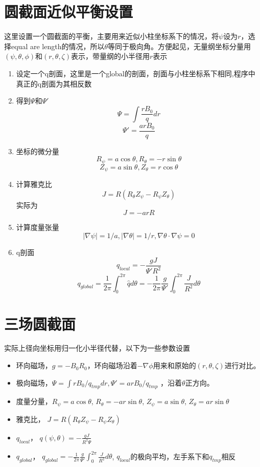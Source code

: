 \documentclass[11pt,a4paper]{article}
\begin{document}
\section{圆截面近似平衡设置}

这里设置一个圆截面的平衡，主要用来近似小柱坐标系下的情况，将$\psi$设为$r$，选择equal are length的情况，所以$\theta$等同于极向角。方便起见，无量纲坐标分量用$(\psi,\theta,\phi)$和$(r,\theta,\zeta)$表示，带量纲的小半径用$r$表示

\begin{enumerate}
 	\item 设定一个q剖面，这里是一个global的剖面，剖面与小柱坐标系下相同,程序中真正的q剖面为其相反数
 	\item 得到$\Psi$和$\Psi'$
 		$$\Psi = \int \frac{rB_0}{q} dr $$ 
 		$$\Psi' = \frac{arB_0}{q}  $$
	\item 坐标的微分量 
		$$ R_\psi = a\cos\theta, R_\theta = -r\sin\theta $$
		$$ Z_\psi = a\sin\theta, Z_\theta =  r\cos\theta $$
	\item 计算雅克比
		$$ J = R(R_\theta Z_\psi - R_\psi Z_\theta) $$
		实际为
		$$ J = -arR $$
	\item 计算度量张量
		$$ |\nabla\psi| = 1/a, |\nabla\theta| = 1/r, \nabla\theta\cdot\nabla\psi = 0 $$ 
	\item q剖面
		$$ q_{local} = -\frac{gJ}{\Psi'R^2} $$
		$$ 
		q_{global} = \frac{1}{2\pi}\int_{0}^{2\pi}\hat{q}d\theta
		=-\frac{1}{2\pi}\frac{g}{\Psi'}\int_{0}^{2\pi}\frac{J}{R^2}d\theta
		$$
\end{enumerate}




\section{三场圆截面}
实际上径向坐标用归一化小半径代替，以下为一些参数设置
\begin{itemize}
	\item 环向磁场，$ g = -B_0R_0 $，环向磁场沿着$-\nabla\phi$用来和原始的$(r,\theta,\zeta)$进行对比。
	\item 极向磁场，$ \Psi = \int{ rB_0/q_{tmp} dr}, \Psi' = arB_0/q_{tmp} $ ，沿着$\theta$正方向。
	\item 度量分量，$ R_\psi = a\cos\theta $, $ R_\theta = -ar\sin\theta $, $ Z_\psi = a\sin\theta $, $ Z_\theta = ar\sin\theta $
	\item 雅克比， $ J = R( R_\theta Z_\psi-R_\psi Z_\theta ) $
	\item $q_{local}$， $ q(\psi,\theta) = -\frac{gJ}{R^2 \Psi} $
	\item $q_{global}$， $ q_{global} = -\frac{1}{2\pi}\frac{g}{\Psi'}\int_{0}^{2\pi}\frac{J}{R^2}d\theta $, $q_{local}$的极向平均，左手系下和$q_{tmp}$相反
\end{itemize}
\end{document}
